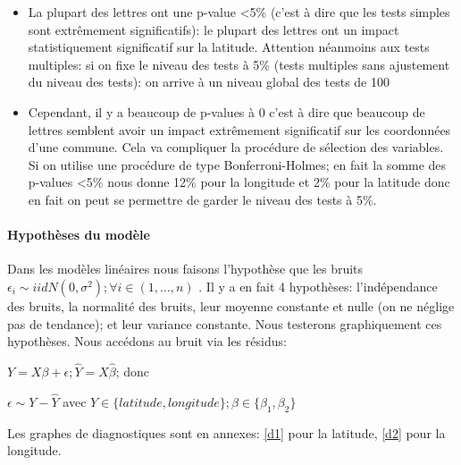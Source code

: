 \documentclass[french]{article}%
\begin{document}
		
		\begin{itemize}
			
			\item La plupart des lettres ont une p-value <5\% (c'est à dire que les tests simples sont extrêmement significatifs): le plupart des lettres ont un impact statistiquement significatif sur la latitude. Attention néanmoins aux tests multiples: si on fixe le niveau des tests à 5\% (tests multiples sans ajustement du niveau des tests): on arrive à un niveau global des tests de 100%
			
			\item Cependant, il y a beaucoup de p-values à 0 c'est à dire que beaucoup de lettres semblent avoir un impact extrêmement significatif sur les coordonnées d'une commune. Cela va compliquer la procédure de sélection des variables. Si on utilise une procédure de type Bonferroni-Holmes; en fait la somme des p-values <5\% 	nous donne 12\% pour la longitude et 2\% pour la latitude donc en fait on peut se permettre de garder le niveau des tests à 5\%.
			
		\end{itemize}

	\paragraph*{Hypothèses du modèle}
	
		Dans les modèles linéaires nous faisons l'hypothèse que les bruits $\epsilon_{i}\sim iid N(0,\sigma^{2}) ; \forall i \in (1,\dots,n)$ . Il y a en fait 4 hypothèses: l'indépendance des bruits, la normalité des bruits, leur moyenne constante et nulle (on ne néglige pas de tendance); et leur variance constante. Nous testerons graphiquement ces hypothèses. Nous accédons au bruit via les résidus: 
		
		$Y=X\beta +\epsilon; \hat{Y}=X\hat{\beta}$; donc 
		
		$\epsilon\sim Y-\hat{Y}$ avec $Y \in \{latitude,longitude\}; \beta \in \{\beta_{1},\beta_{2}\}$
	
		Les graphes de diagnostiques sont en annexes: \autoref{d1} pour la latitude, \autoref{d2} pour la longitude.
		
\end{document}
